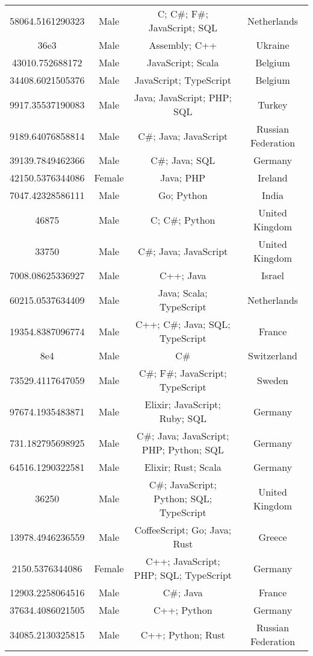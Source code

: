 \begin{center}
\begin{tabular}{ |c|c|c|c| }
58064.5161290323  &  Male  &  C; C\#; F\#; JavaScript; SQL  &  Netherlands  \\ 
36e3  &  Male  &  Assembly; C++  &  Ukraine  \\ 
43010.752688172  &  Male  &  JavaScript; Scala  &  Belgium  \\ 
34408.6021505376  &  Male  &  JavaScript; TypeScript  &  Belgium  \\ 
9917.35537190083  &  Male  &  Java; JavaScript; PHP; SQL  &  Turkey  \\ 
9189.64076858814  &  Male  &  C\#; Java; JavaScript  &  Russian Federation  \\ 
39139.7849462366  &  Male  &  C\#; Java; SQL  &  Germany  \\ 
42150.5376344086  &  Female  &  Java; PHP  &  Ireland  \\ 
7047.42328586111  &  Male  &  Go; Python  &  India  \\ 
46875  &  Male  &  C; C\#; Python  &  United Kingdom  \\ 
33750  &  Male  &  C\#; Java; JavaScript  &  United Kingdom  \\ 
7008.08625336927  &  Male  &  C++; Java  &  Israel  \\ 
60215.0537634409  &  Male  &  Java; Scala; TypeScript  &  Netherlands  \\ 
19354.8387096774  &  Male  &  C++; C\#; Java; SQL; TypeScript  &  France  \\ 
8e4  &  Male  &  C\#  &  Switzerland  \\ 
73529.4117647059  &  Male  &  C\#; F\#; JavaScript; TypeScript  &  Sweden  \\ 
97674.1935483871  &  Male  &  Elixir; JavaScript; Ruby; SQL  &  Germany  \\ 
731.182795698925  &  Male  &  C\#; Java; JavaScript; PHP; Python; SQL  &  Germany  \\ 
64516.1290322581  &  Male  &  Elixir; Rust; Scala  &  Germany  \\ 
36250  &  Male  &  C\#; JavaScript; Python; SQL; TypeScript  &  United Kingdom  \\ 
13978.4946236559  &  Male  &  CoffeeScript; Go; Java; Rust  &  Greece  \\ 
2150.5376344086  &  Female  &  C++; JavaScript; PHP; SQL; TypeScript  &  Germany  \\ 
12903.2258064516  &  Male  &  C\#; Java  &  France  \\ 
37634.4086021505  &  Male  &  C++; Python  &  Germany  \\ 
34085.2130325815  &  Male  &  C++; Python; Rust  &  Russian Federation  \\ 

\end{tabular}
\end{center}
